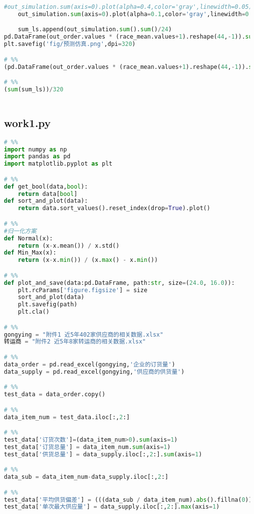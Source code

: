 \begin{appendices}
\begin{lstlisting}[language=python]
    #out_simulation.sum(axis=0).plot(alpha=0.4,color='gray',linewidth=0.05)
    out_simulation.sum(axis=0).plot(alpha=0.1,color='gray',linewidth=0.5)

    sum_ls.append(out_simulation.sum().sum()/24)
pd.DataFrame(out_order.values * (race_mean.values+1).reshape(44,-1)).sum().plot(color='r',linewidth=2)
plt.savefig('fig/预测仿真.png',dpi=320)

# %%
(pd.DataFrame(out_order.values * (race_mean.values+1).reshape(44,-1)).sum().sum())/24

# %%
(sum(sum_ls))/320



\end{lstlisting}

\subsection{work1.py}

\begin{lstlisting}[language=python]
# %%
import numpy as np
import pandas as pd
import matplotlib.pyplot as plt

# %%
def get_bool(data,bool):
    return data[bool]
def sort_and_plot(data):
    return data.sort_values().reset_index(drop=True).plot()

# %%
#归一化方案
def Normal(x):
    return (x-x.mean()) / x.std()
def Min_Max(x):
    return (x-x.min()) / (x.max() - x.min())

# %%
def plot_and_save(data:pd.DataFrame, path:str, size=(24.0, 16.0)):
    plt.rcParams['figure.figsize'] = size
    sort_and_plot(data)
    plt.savefig(path)
    plt.cla()

# %%
gongying = "附件1 近5年402家供应商的相关数据.xlsx"
转运商 = "附件2 近5年8家转运商的相关数据.xlsx"

# %%
data_order = pd.read_excel(gongying,'企业的订货量')
data_supply = pd.read_excel(gongying,'供应商的供货量')

# %%
test_data = data_order.copy()

# %%
data_item_num = test_data.iloc[:,2:]

# %%
test_data['订货次数']=(data_item_num>0).sum(axis=1)
test_data['订货总量'] = data_item_num.sum(axis=1)
test_data['供货总量'] = data_supply.iloc[:,2:].sum(axis=1)

# %%
data_sub = data_item_num-data_supply.iloc[:,2:]

# %%
test_data['平均供货偏差'] = (((data_sub / data_item_num).abs().fillna(0)).sum(axis=1) / test_data['订货次数'])
test_data['单次最大供应量'] = data_supply.iloc[:,2:].max(axis=1)


\end{lstlisting}
\end{appendices}
